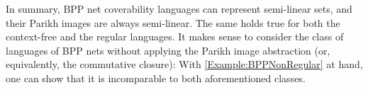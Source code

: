 \documentclass[../../diss.tex]{subfiles}
\begin{document}
In summary, BPP net coverability languages can  represent semi-linear sets, and their Parikh images are always semi-linear.
The same holds true for both the context-free and the regular languages.
It makes sense to consider the class of languages of BPP nets without applying the Parikh image abstraction (or, equivalently, the commutative closure): With \cref{Example:BPPNonRegular} at hand, one can show that it is incomparable to both aforementioned classes.
\end{document}
